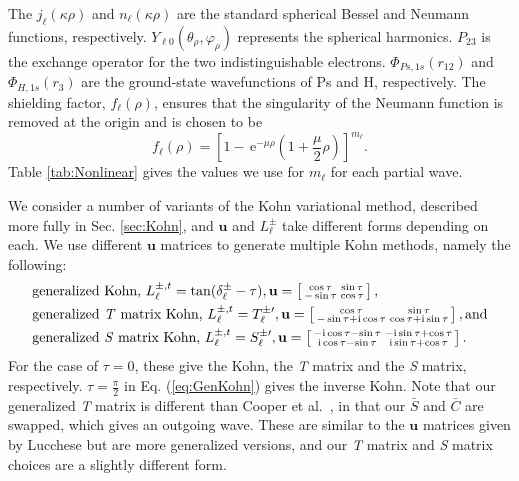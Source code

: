 \documentclass[preprint,showpacs,showkeys,preprintnumbers,amsmath,amssymb,longbibliography,pra,aps]{revtex4-1}
\newcommand{\ee} {\,\text{e}}
\newcommand{\ii}{{\rm{i}}}
\begin{document}
The $j_\ell\left(\kappa\rho\right)$ and $n_\ell\left(\kappa\rho\right)$ are
the standard spherical Bessel and Neumann functions, respectively.
$Y_{\ell 0}(\theta_\rho, \varphi_\rho)$ represents the spherical harmonics.
$P_{23}$ is the exchange operator for the two indistinguishable electrons.
$\Phi_{Ps,1s}\left(r_{12}\right)$ and $\Phi_{H,1s}\left(r_3\right)$ are the 
ground-state wavefunctions of Ps and H, respectively. The shielding factor,
$f_\ell(\rho)$, ensures that the singularity of the Neumann function is removed
at the origin and is chosen to be
\begin{equation}
f_\ell(\rho) = \left[1 - \ee^{-\mu \rho} \left(1+\frac{\mu}{2}\rho\right)
\right]^{m_\ell}.
\label{eq:PartialWaveShielding}
\end{equation}
Table \ref{tab:Nonlinear} gives the values we use for $m_\ell$ for each partial
wave.

We consider a number of variants of the Kohn variational method, described more
fully in Sec. \ref{sec:Kohn}, and $\textbf{u}$ and $L^{\pm}_\ell$ take
different forms depending on each. We use different $\textbf{u}$ matrices to
generate multiple Kohn methods, namely the following:
\begin{subequations}
\label{eq:KohnU}
\begin{align}
&\text{generalized Kohn, } L^{\pm,t}_\ell = \tan(\delta^{\pm}_\ell-\tau),
 \textbf{u} = \left[ \begin{smallmatrix}
\cos \tau & \sin \tau \\  -\sin \tau & \cos \tau
\end{smallmatrix} \right], \label{eq:GenKohn}\\
&\text{generalized \emph{T} matrix Kohn, } L^{\pm,t}_\ell = T_\ell^{\pm\prime},
 \textbf{u} = \left[ \begin{smallmatrix}
\cos\tau & \sin\tau \\ -\sin\tau + \ii \cos\tau & \cos\tau + \ii \sin\tau
\end{smallmatrix} \right], \text{and}\label{eq:GenTKohn} \\
&\text{generalized \emph{S} matrix Kohn, } L^{\pm,t}_\ell = S_\ell^{\pm\prime},
 \textbf{u} = \left[ \begin{smallmatrix}
-\ii \cos\tau - \sin\tau & -\ii\sin\tau + \cos\tau \\ 
 \ii\cos\tau - \sin\tau & \ii\sin\tau + \cos\tau
\end{smallmatrix} \right]. \label{eq:GenSKohn}
\end{align}
\end{subequations}
For the case of $\tau = 0$, these give the Kohn, the \emph{T} matrix and the 
\emph{S} matrix, respectively. $\tau = \frac{\pi}{2}$ in Eq. (\ref{eq:GenKohn})
gives the inverse Kohn. Note that our generalized \emph{T} matrix is 
different than Cooper et al.\ \cite{Cooper2010}, in that our $\bar{S}$ and
$\bar{C}$ are swapped, which gives an outgoing wave. These are similar to the
$\textbf{u}$ matrices given by Lucchese \cite{Lucchese1989} but are more 
generalized versions, and our \emph{T} matrix and \emph{S} matrix choices are 
a slightly different form.
\end{document}
